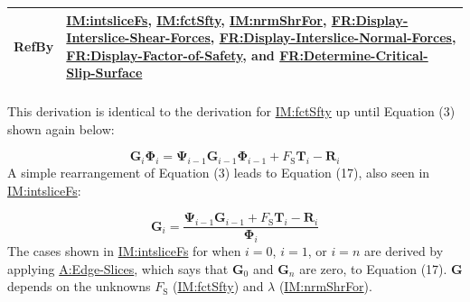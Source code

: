 \documentclass[12pt]{article}
\begin{document}
\begin{minipage}{\textwidth}
\begin{tabular}{>{\raggedright}p{}>{\raggedright\arraybackslash}p{}}
\\ \midrule
RefBy & \hyperref[IM:intsliceFs]{IM:intsliceFs}, \hyperref[IM:fctSfty]{IM:fctSfty}, \hyperref[IM:nrmShrFor]{IM:nrmShrFor}, \hyperref[displayShear]{FR:Display-Interslice-Shear-Forces}, \hyperref[displayNormal]{FR:Display-Interslice-Normal-Forces}, \hyperref[displayFS]{FR:Display-Factor-of-Safety}, and \hyperref[determineCritSlip]{FR:Determine-Critical-Slip-Surface}
        
\\ \bottomrule
\end{tabular}
\end{minipage}

\paragraph{}
\label{IM:intsliceFsDeriv}
This derivation is identical to the derivation for \hyperref[IM:fctSfty]{IM:fctSfty} up until Equation (3) shown again below:

\begin{displaymath}
{\symbf{G}}_{i} {\symbf{Φ}}_{i}={\symbf{Ψ}}_{i-1} {\symbf{G}}_{i-1} {\symbf{Φ}}_{i-1}+{F_{\text{S}}} {\symbf{T}}_{i}-{\symbf{R}}_{i}
\end{displaymath}
A simple rearrangement of Equation (3) leads to Equation (17), also seen in \hyperref[IM:intsliceFs]{IM:intsliceFs}:

\begin{displaymath}
{\symbf{G}}_{i}=\frac{{\symbf{Ψ}}_{i-1} {\symbf{G}}_{i-1}+{F_{\text{S}}} {\symbf{T}}_{i}-{\symbf{R}}_{i}}{{\symbf{Φ}}_{i}}
\end{displaymath}
The cases shown in \hyperref[IM:intsliceFs]{IM:intsliceFs} for when $i=0$, $i=1$, or $i=n$ are derived by applying \hyperref[assumpES]{A:Edge-Slices}, which says that ${\symbf{G}}_{0}$ and ${\symbf{G}}_{n}$ are zero, to Equation (17). $\symbf{G}$ depends on the unknowns ${F_{\text{S}}}$ (\hyperref[IM:fctSfty]{IM:fctSfty}) and $λ$ (\hyperref[IM:nrmShrFor]{IM:nrmShrFor}).
\end{document}
